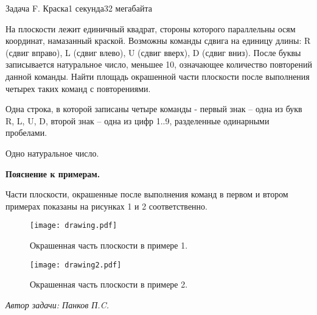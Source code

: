 \documentclass[11pt,a4paper,oneside]{article}
\begin{document}
\begin{problem}{Задача F. Краска}{1 секунда}{32 мегабайта}

На плоскости лежит единичный квадрат, стороны которого параллельны осям координат, намазанный краской. Возможны команды сдвига на единицу длины:
R (сдвиг вправо), L (сдвиг влево), U (сдвиг вверх), D (сдвиг вниз).
После буквы записывается натуральное число, меньшее 10, означающее количество повторений данной команды.
Найти площадь окрашенной части плоскости после выполнения четырех таких команд с повторениями.


\InputFile
Одна строка, в которой записаны четыре команды - первый знак – одна из букв R, L, U, D,  второй знак – одна из цифр 1..9, разделенные одинарными пробелами.


\OutputFile
Одно натуральное число.


\Examples

\begin{example}%
%
%
\end{example}

\vspace{0.3cm}
\medskip\noindent
\textbf{Пояснение к примерам.}


Части плоскости, окрашенные после выполнения команд в первом и втором примерах показаны на рисунках 1 и 2 соответственно.

\begin{figure}[ht]
\centering
\texttt{[image: drawing.pdf]}
\caption{Окрашенная часть плоскости в примере 1.}
\end{figure}


\begin{figure}[ht]
\centering
\texttt{[image: drawing2.pdf]}
\caption{Окрашенная часть плоскости в примере 2.}
\end{figure}


\vspace{1.0cm}
\hfill \textit{Автор задачи: Панков П.C.}
\medskip\noindent




\end{problem}
\end{document}
